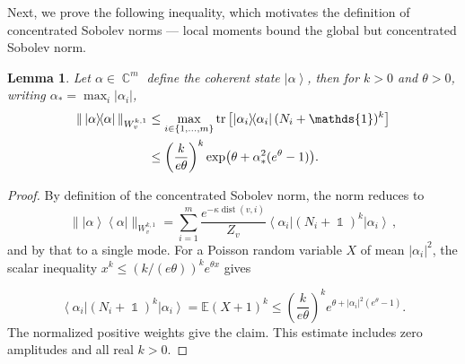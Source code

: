 \documentclass[11pt]{article}
\theoremstyle{myplain}
\newtheorem{lem}[lem]{Lemma}
\theoremstyle{mydefinition}
\theoremstyle{remark}
\DeclareMathOperator{\C}{\mathbb{C}}
\DeclareMathOperator{\dist}{dist}
\DeclareMathOperator{\1}{\mathds{1}}
\newcommand{\ketbra}[2]{\left\vert#1\right\rangle\!\! \left\langle#2\right\vert}
\newcommand{\ket}[1]{\left\vert #1 \right\rangle}
\newcommand{\bra}[1]{\left\langle #1 \right\vert}
\newcommand{\tr}[1][]{\operatorname{tr}%
  \ifx#1\empty \else \left[ #1 \right] \fi}
\begin{document}
        Next, we prove the following inequality, which motivates the definition of concentrated Sobolev norms --- local moments bound the global but concentrated Sobolev norm.
        \begin{lem}\label{appx-lem:bound-coherent-state}
            Let $\alpha\in\C^m$ define the coherent state $\ket{\alpha}$, then for $k>0$ and $\theta>0$, writing $\alpha_*=\max_i|\alpha_i|$,
            \begin{align*}
                \|\ketbra{\alpha}{\alpha}\|_{W^{k,1}_v}
                &\leq\max_{i\in\{1,...,m\}}\tr[\ketbra{\alpha_i}{\alpha_i}(N_i+\1)^k]\\
                &\leq\left(\frac{k}{e\theta}\right)^k
                \exp\bigl(\theta+\alpha_*^2(e^\theta-1)\bigr).
            \end{align*}
        \end{lem}
        \begin{proof}
            By definition of the concentrated Sobolev norm, the norm reduces to
            \begin{equation*}
                \|\ket{\alpha}\bra{\alpha}\|_{W^{k,1}_v}=\sum_{i=1}^m\frac{e^{-\kappa\dist(v,i)}}{Z_v}\bra{\alpha_i}(N_i+ \1)^k\ket{\alpha_i}\,,
            \end{equation*}
            and by that to a single mode. For a Poisson random variable $X$ of mean $|\alpha_i|^2$, the scalar inequality $x^k\leq(k/(e\theta))^k e^{\theta x}$ gives
            
            \begin{equation}
                \bra{\alpha_i}(N_i+\1)^k\ket{\alpha_i}
                =\mathbb E(X+1)^k
                \leq\left(\frac{k}{e\theta}\right)^k
                e^{\theta+|\alpha_i|^2(e^\theta-1)}.
            \end{equation}
            The normalized positive weights give the claim. This estimate includes zero amplitudes and all real $k>0$.
            
        \end{proof}
\end{document}
